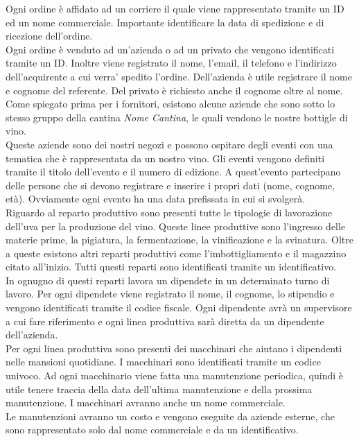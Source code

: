 Ogni ordine è affidato ad un corriere il quale viene rappresentato tramite un ID ed un nome commerciale. Importante identificare la data  di spedizione e di ricezione dell'ordine.\\
Ogni ordine è venduto ad un'azienda o ad un privato che vengono identificati tramite un ID. Inoltre viene registrato il nome, l'email, il telefono e l'indirizzo dell'acquirente a cui verra' spedito l'ordine. Dell'azienda è utile registrare il nome e cognome del referente. Del privato è richiesto anche il cognome oltre al nome. Come spiegato prima per i fornitori, esistono alcune aziende che sono sotto lo stesso gruppo della cantina \emph{Nome Cantina}, le quali vendono le nostre bottigle di vino.\\
Queste aziende sono dei nostri negozi e possono ospitare degli eventi con una tematica che è rappresentata da un nostro vino. Gli eventi vengono definiti tramite il titolo dell'evento e il numero di edizione. A quest'evento partecipano delle persone che si devono registrare e inserire i propri dati (nome, cognome, età). Ovviamente ogni evento ha una data prefissata in cui si svolgerà.\\
Riguardo al reparto produttivo sono presenti tutte le tipologie di lavorazione dell'uva per la produzione del vino. Queste linee produttive sono l'ingresso delle materie prime, la pigiatura, la fermentazione, la vinificazione e la svinatura. Oltre a queste esistono altri reparti produttivi come l'imbottigliamento e il magazzino citato all'inizio. Tutti questi reparti sono identificati tramite un identificativo.\\
In ognugno di questi reparti lavora un dipendete in un determinato turno di lavoro. Per ogni dipendete viene registrato il nome, il cognome, lo stipendio e vengono identificati tramite il codice fiscale. Ogni dipendente avrà un supervisore a cui fare riferimento e ogni linea produttiva sarà diretta da un dipendente dell'azienda.\\
Per ogni linea produttiva sono presenti dei macchinari che aiutano i dipendenti nelle mansioni quotidiane. I macchinari sono identificati tramite un codice univoco. Ad ogni macchinario viene fatta una manutenzione periodica, quindi è utile tenere traccia della data dell'ultima manutenzione e della prossima manutenzione. I macchinari avranno anche un nome commerciale.\\
Le manutenzioni avranno un costo e vengono eseguite da aziende esterne, che sono rappresentato solo dal nome commerciale e da un identificativo.